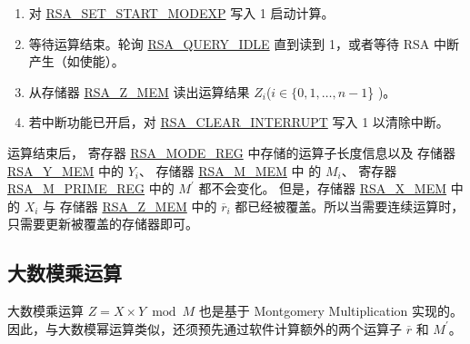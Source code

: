 \documentclass[main\_\_CN.tex]{subfiles}
\begin{document}
\begin{enumerate}
    \item 对 \hyperref[fielddesc:RSASETSTARTMODEXP]{RSA\_SET\_START\_MODEXP} 写入 1 启动计算。

    \item 等待运算结束。轮询 \hyperref[fielddesc:RSAQUERYIDLE]{RSA\_QUERY\_IDLE} 直到读到 1，或者等待 RSA 中断产生（如使能）。

    \item 从存储器 \hyperref[regdesc:RSAmemory]{RSA\_Z\_MEM} 读出运算结果 \begin{math}Z_{i}\end{math}(\begin{math}i \in \{ 0, 1, \dots, n-1 \end{math}\} )。

    \item 若中断功能已开启，对 \hyperref[fielddesc:RSACLEARINTERRUPT]{RSA\_CLEAR\_INTERRUPT} 写入 1 以清除中断。

\end{enumerate}

运算结束后，
寄存器 \hyperref[regdesc:RSAMODEREG]{RSA\_MODE\_REG} 中存储的运算子长度信息以及
存储器 \hyperref[regdesc:RSAmemory]{RSA\_Y\_MEM} 中的 \begin{math}Y_{i}\end{math}、
存储器 \hyperref[regdesc:RSAmemory]{RSA\_M\_MEM} 中 的 \begin{math}M_{i}\end{math}、
寄存器 \hyperref[regdesc:RSAMPRIMEREG]{RSA\_M\_PRIME\_REG} 中的 \begin{math}M^{\prime}\end{math} 都不会变化。
但是，存储器 \hyperref[regdesc:RSAmemory]{RSA\_X\_MEM} 中的 \begin{math}X_{i}\end{math} 与
存储器 \hyperref[regdesc:RSAmemory]{RSA\_Z\_MEM} 中的 \begin{math}\overline{r}_{i}\end{math}
都已经被覆盖。所以当需要连续运算时，只需要更新被覆盖的存储器即可。


\subsection{大数模乘运算}

大数模乘运算 \begin{math}Z = X \times Y \bmod M\end{math} 也是基于 Montgomery Multiplication 实现的。因此，与大数模幂运算类似，还须预先通过软件计算额外的两个运算子
\begin{math}\overline{r}\end{math} 和
\begin{math}M^{\prime}\end{math}。
\end{document}

